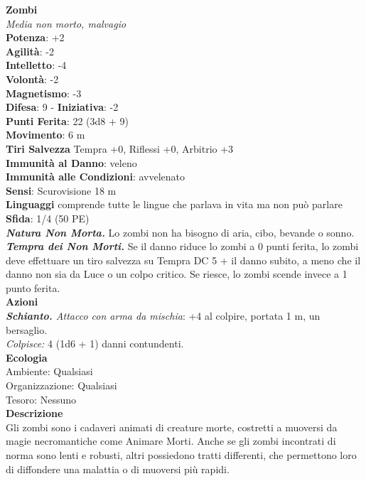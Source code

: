 \begin{multicols}{2}
\medskip\textbf{Zombi}\\
\emph{Media non morto, malvagio}\\
\textbf{Potenza}: +2\\
\textbf{Agilità}: -2\\
\textbf{Intelletto}: -4\\
\textbf{Volontà}: -2\\
\textbf{Magnetismo}: -3\\
\textbf{Difesa}: 9 - \textbf{Iniziativa}: -2\\
\textbf{Punti Ferita}: 22 (3d8 + 9)\\
\textbf{Movimento}: 6 m\\
\textbf{Tiri Salvezza}  Tempra +0, Riflessi +0, Arbitrio +3\\
\textbf{Immunità al Danno}: veleno\\
\textbf{Immunità alle Condizioni}: avvelenato\\
\textbf{Sensi}: Scurovisione 18 m\\
\textbf{Linguaggi} comprende tutte le lingue che parlava in vita ma non può parlare\\
\textbf{Sfida}: 1/4 (50 PE)\smallskip\\
\emph{\textbf{Natura Non Morta.}} Lo zombi non ha bisogno di aria, cibo, bevande o sonno.\\
\emph{\textbf{Tempra dei Non Morti.}} Se il danno riduce lo zombi a 0 punti ferita, lo zombi deve effettuare un tiro salvezza su Tempra DC 5 + il danno subito, a meno che il danno non sia da Luce o un colpo critico. Se riesce, lo zombi scende invece a 1 punto ferita.\\
\smallskip\textbf{Azioni}\\
\emph{\textbf{Schianto.} Attacco con arma da mischia}: +4 al colpire, portata 1 m, un bersaglio.\\
\emph{Colpisce:} 4 (1d6 + 1) danni contundenti.\\
\textbf{Ecologia}\\
Ambiente: Qualsiasi\\
Organizzazione: Qualsiasi\\
Tesoro: Nessuno\\
\textbf{Descrizione}\\
Gli zombi sono i cadaveri animati di creature morte, costretti a muoversi da magie necromantiche come Animare Morti. Anche se gli zombi incontrati di norma sono lenti e robusti, altri possiedono tratti differenti, che permettono loro di diffondere una malattia o di muoversi più rapidi.\\


\end{multicols}
